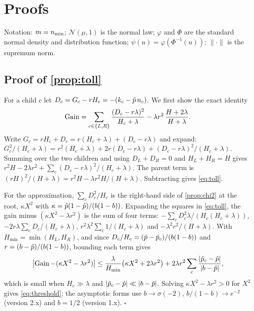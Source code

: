\section{Proofs}\label{app:proofs}

Notation: $m = n_{\min}$; $\mathcal N(\mu,1)$ is the normal law; $\varphi$ and $\Phi$ are the standard normal density and distribution function; $\psi(u) = \varphi(\Phi^{-1}(u))$; $\|\cdot\|$ is the supremum norm.

\subsection{Proof of \texorpdfstring{\cref{prop:toll}}{the intercept toll}}\label{app:proof-toll}

For a child $c$ let $D_c = G_c - rH_c = -(k_c - \hat p\,n_c)$. We first show the exact identity
\begin{equation}\label{eq:toll}
  \operatorname{Gain} = \sum_{c\in\{L,R\}} \frac{(D_c - r\lambda)^2}{H_c + \lambda} - \lambda r^2\,\frac{H + 2\lambda}{H+\lambda}.
\end{equation}
Write $G_c = rH_c + D_c = r(H_c+\lambda) + (D_c - r\lambda)$ and expand: $G_c^2/(H_c+\lambda) = r^2(H_c+\lambda) + 2r(D_c - r\lambda) + (D_c - r\lambda)^2/(H_c+\lambda)$. Summing over the two children and using $D_L + D_R = 0$ and $H_L + H_R = H$ gives $r^2H - 2\lambda r^2 + \sum_c (D_c-r\lambda)^2/(H_c+\lambda)$. The parent term is $(rH)^2/(H+\lambda) = r^2H - \lambda r^2H/(H+\lambda)$. Subtracting gives \eqref{eq:toll}.

For the approximation, $\sum_c D_c^2/H_c$ is the right-hand side of \cref{prop:chi2} at the root, $\kappa X^2$ with $\kappa = \hat p(1-\hat p)/(b(1-b))$. Expanding the squares in \eqref{eq:toll}, the gain minus $(\kappa X^2 - \lambda r^2)$ is the sum of four terms: $-\sum_c D_c^2\lambda/(H_c(H_c+\lambda))$, $-2r\lambda\sum_c D_c/(H_c+\lambda)$, $r^2\lambda^2\sum_c 1/(H_c+\lambda)$ and $-\lambda^2r^2/(H+\lambda)$. With $H_{\min} = \min(H_L, H_R)$, and since $D_c/H_c = (\hat p - \hat p_c)/(b(1-b))$ and $r = (b-\hat p)/(b(1-b))$, bounding each term gives
\begin{equation}\label{eq:remainder}
  \bigl|\operatorname{Gain} - (\kappa X^2 - \lambda r^2)\bigr| \le \frac{\lambda}{H_{\min}}\bigl(\kappa X^2 + 2\lambda r^2\bigr) + 2\lambda r^2\sum_c \frac{|\hat p_c - \hat p|}{|b-\hat p|},
\end{equation}
which is small when $H_c \gg \lambda$ and $|\hat p_c - \hat p| \ll |b - \hat p|$. Solving $\kappa X^2 - \lambda r^2 > 0$ for $X^2$ gives \eqref{eq:threshold}; the asymptotic forms use $b \to \sigma(-2)$, $b/(1-b) \to e^{-2}$ (version 2.x) and $b = 1/2$ (version 1.x). \hfill$\square$


